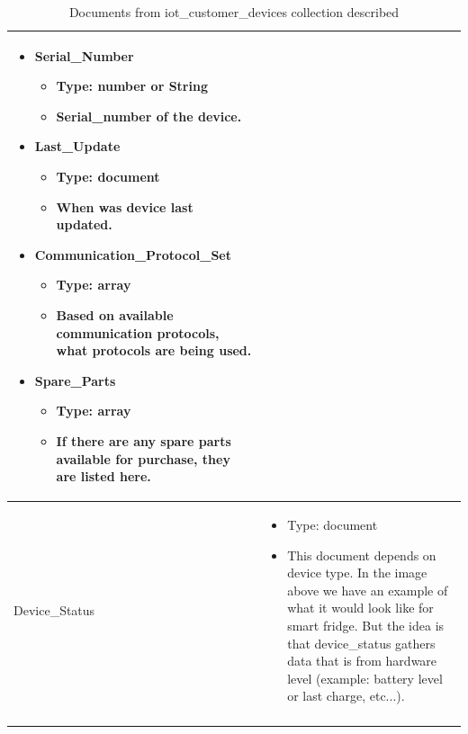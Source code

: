 \begin{center}
\begin{longtable}{ |m{4cm}|m{9cm}| }
\begin{itemize}
\begin{itemize}
        \item Serial{\_}Number
        \begin{itemize}
            \item Type: number or String
            \item Serial{\_}number of the device.
        \end{itemize}
        
        \item Last{\_}Update
        \begin{itemize}
            \item Type: document
            \item When was device last updated.
        \end{itemize}
        
        \item Communication{\_}Protocol{\_}Set
        \begin{itemize}
            \item Type: array
            \item Based on available communication protocols, what protocols are being used.
        \end{itemize}
        
        \item Spare{\_}Parts
        \begin{itemize}
            \item Type: array
            \item If there are any spare parts available for purchase, they are listed here.
        \end{itemize}
    \end{itemize} 
  \end{itemize} \\
 \hline
   Device{\_}Status &   
  \begin{itemize}
    \item Type: document
    \item This document depends on device type. In the image above we have an example of what it would look like for smart fridge. But the idea is that device{\_}status gathers data that is from hardware level (example: battery level or last charge, etc...).
  \end{itemize} \\
 \hline
\caption{Documents from iot{\_}customer{\_}devices collection described}
\end{longtable}
\end{center}

